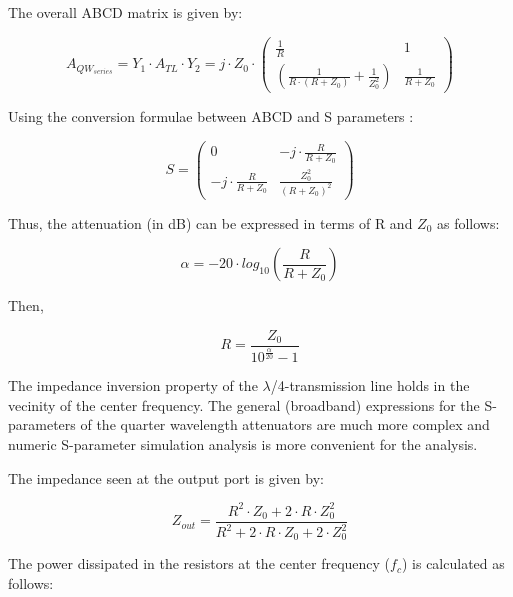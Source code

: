 \noindent The overall ABCD matrix is given by:

\begin{equation}
    A_{QW_{series}} = Y_1 \cdot A_{TL} \cdot Y_2 = j \cdot Z_0 \cdot \begin{pmatrix}
        \frac{1}{R} & 1\\
        \left( \frac{1}{R \cdot (R + Z_0)} + \frac{1}{Z_0^2} \right)  & \frac{1}{R + Z_0}
    \end{pmatrix}
\end{equation}

\noindent Using the conversion formulae between ABCD and S parameters \cite{pozar2012microwave}:

\begin{equation}
    S = \begin{pmatrix}
        0 & -j \cdot \frac{R}{R + Z_0}\\
        -j \cdot \frac{R}{R+Z_0}  & \frac{Z_0^2}{(R + Z_0)^2}
    \end{pmatrix}
\end{equation}

\noindent Thus, the attenuation (in dB) can be expressed in terms of R and $Z_0$ as follows:

\begin{equation}
    \alpha = -20 \cdot log_{10} \left( \frac{R}{R+Z_0}\right)
\end{equation}

\noindent Then,

\begin{equation}
    R = \frac{Z_0}{10^{\frac{\alpha}{20}} - 1}
\end{equation}

\noindent The impedance inversion property of the $\lambda$/4-transmission line holds in the vecinity of the center frequency. The general (broadband) expressions for the S-parameters of the quarter wavelength attenuators are much more complex and numeric S-parameter simulation analysis is more convenient for the analysis.

\noindent The impedance seen at the output port is given by:

\begin{equation}
    Z_{out} = \frac{R^2 \cdot Z_0 + 2 \cdot R \cdot Z_0^2}{R^2 + 2 \cdot R \cdot Z_0 + 2 \cdot Z_0^2}
\end{equation}

\noindent The power dissipated in the resistors at the center frequency ($f_c$) is calculated as follows:

